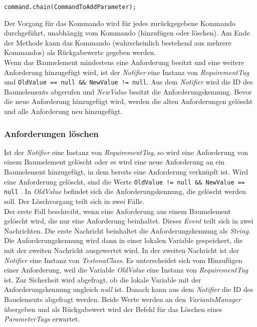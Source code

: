 \begin{lstlisting}
command.chain(CommandToAddParameter);
\end{lstlisting}

Der Vorgang für das Kommando wird für jedes zurückgegebene Kommando durchgeführt, unabhängig vom Kommando (hinzufügen oder löschen). Am Ende der Methode kann das Kommando (wahrscheinlich bestehend aus mehrere Kommandos) als Rückgabewerte gegeben werden.\\


Wenn das Baumelement mindestens eine Anforderung besitzt und eine weitere Anforderung hinzugefügt wird, ist der \textit{Notifier} eine Instanz von \textit{RequirementTag} und \texttt{OldValue == null \&\& NewValue != null}. Aus dem \textit{Notifier} wird die ID des Baumelements abgerufen und \textit{NewValue} besitzt die Anforderungskennung. Bevor die neue Anforderung hinzugefügt wird, werden die alten Anforderungen gelöscht und alle Anforderung neu hinzugefügt.\\


\subsubsection{Anforderungen löschen}
Ist der \textit{Notifier} eine Instanz von \textit{RequirementTag}, so wird eine Anforderung von einem Baumelement gelöscht oder es wird eine neue Anforderung an ein Baumelement hinzugefügt, in dem bereits eine Anforderung verknüpft ist. Wird eine Anforderung gelöscht, sind die Werte \texttt{OldValue != null \&\& NewValue == null} . In \textit{OldValue} befindet sich die Anforderungskennung, die gelöscht werden soll. Der Löschvorgang teilt sich in zwei Fälle.\\


Der erste Fall beschreibt, wenn eine Anforderung aus einem Baumelement gelöscht wird, die nur eine Anforderung beinhaltet. Dieses \textit{Event} teilt sich in zwei Nachrichten. Die erste Nachricht beinhaltet die Anforderungskennung als \textit{String}. Die Anforderungskennung wird dann in einer lokalen Variable gespeichert, die mit der zweiten Nachricht ausgewertet wird. In der zweiten Nachricht ist der \textit{Notifier} eine Instanz von \textit{TestonaClass}. Es unterscheidet sich vom Hinzufügen einer Anforderung, weil die Variable \textit{OldValue} eine Instanz von \textit{RequirementTag} ist. Zur Sicherheit wird abgefragt, ob die lokale Variable mit der Anforderungskennung ungleich \textit{null} ist. Danach kann aus dem \textit{Notifier} die ID des Bauelements abgefragt werden. Beide Werte werden an den \textit{VariantsManager} übergeben und als Rückgabewert wird der Befehl für das Löschen eines \textit{ParameterTags}  erwartet.\\



